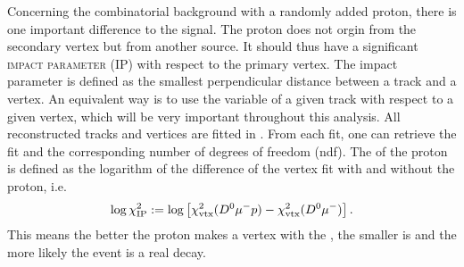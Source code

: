 Concerning the combinatorial background  with a randomly added proton, there is one important difference to the signal.
The proton does not orgin from the secondary vertex but from another source.
It should thus have a significant \textsc{impact parameter (IP)} with respect to the primary vertex.
The impact parameter is defined as the smallest perpendicular distance between a track and a vertex.
An equivalent way is to use the \logIP variable of a given track with respect to a given vertex, which will be very important throughout this analysis.
All reconstructed tracks and vertices are fitted in \lhcb.
From each fit, one can retrieve the fit \chisq and the corresponding number of degrees of freedom (ndf).
The \logIP of the proton is defined as the logarithm of the difference of the \Dz\mun vertex fit \chisq with and without the proton, i.e.
\begin{align}
    \log \chi^2_{\text{IP}} := \log\left[ \chi^2_{\rm vtx}({{D}^0}{\mu^-}{p}) - \chi^2_{\rm vtx}({{D}^0}{\mu^-}) \right].
\end{align}
This means the better the proton makes a vertex with the \Dz\mun, the smaller is \logIP and the more likely the event is a real \LbToDpmunuX decay.

